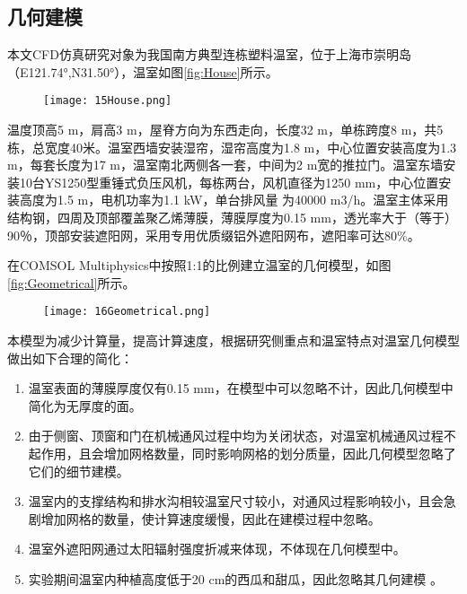 	\subsection{几何建模}
本文CFD仿真研究对象为我国南方典型连栋塑料温室，位于上海市崇明岛（E121.74°,N31.50°），温室如图\ref{fig:House}所示。

	\begin{figure}[!htbp]
		\centering
		\texttt{[image: 15House.png]}
	\end{figure}
温度顶高5 m，肩高3 m，屋脊方向为东西走向，长度32 m，单栋跨度8 m，共5栋，总宽度40米。温室西墙安装湿帘，湿帘高度为1.8 m，中心位置安装高度为1.3 m，每套长度为17 m，温室南北两侧各一套，中间为2 m宽的推拉门。温室东墙安装10台YS1250型重锤式负压风机，每栋两台，风机直径为1250 mm，中心位置安装高度为1.5 m，电机功率为1.1 kW，单台排风量 为40000 m3/h。温室主体采用结构钢，四周及顶部覆盖聚乙烯薄膜，薄膜厚度为0.15 mm，透光率大于（等于）90％，顶部安装遮阳网，采用专用优质缀铝外遮阳网布，遮阳率可达80\%。

在COMSOL Multiphysics中按照1:1的比例建立温室的几何模型，如图\ref{fig:Geometrical}所示。

	\begin{figure}[!htbp]
		\centering
		\texttt{[image: 16Geometrical.png]}
	\end{figure}
本模型为减少计算量，提高计算速度，根据研究侧重点和温室特点对温室几何模型做出如下合理的简化：
	\begin{enumerate}
		\item 温室表面的薄膜厚度仅有0.15 mm，在模型中可以忽略不计，因此几何模型中简化为无厚度的面。
		\item 由于侧窗、顶窗和门在机械通风过程中均为关闭状态，对温室机械通风过程不起作用，且会增加网格数量，同时影响网格的划分质量，因此几何模型忽略了它们的细节建模。
		\item 温室内的支撑结构和排水沟相较温室尺寸较小，对通风过程影响较小，且会急剧增加网格的数量，使计算速度缓慢，因此在建模过程中忽略。
		\item 温室外遮阳网通过太阳辐射强度折减来体现，不体现在几何模型中。
		\item 实验期间温室内种植高度低于20 cm的西瓜和甜瓜，因此忽略其几何建模\supercite{HeKeshi2012,RenShougang2015} 。
	\end{enumerate}
	
